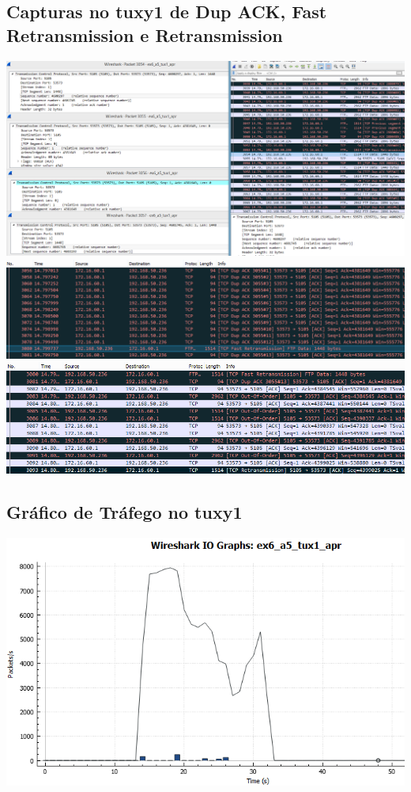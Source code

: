 \documentclass[11pt,a4paper,reqno]{report}
\numberwithin{equation}{section}
\begin{document}
\begin{appendices}
\subsection{Capturas no tuxy1 de Dup ACK, Fast Retransmission e Retransmission}
\label{ex6_retrans}
\includegraphics[width=18cm]{ex6_tux1_3054.png}\\
\includegraphics[width=18cm]{ex6_tux1_fastretransmission.png}\\
\includegraphics[width=18cm]{ex6_tux1_retransmission.png}

\subsection{Gráfico de Tráfego no tuxy1}
\label{ex6_a5_1io}
\includegraphics[width=18cm]{ex6_a5_tux1_IO.png}

\end{appendices}
\end{document}
